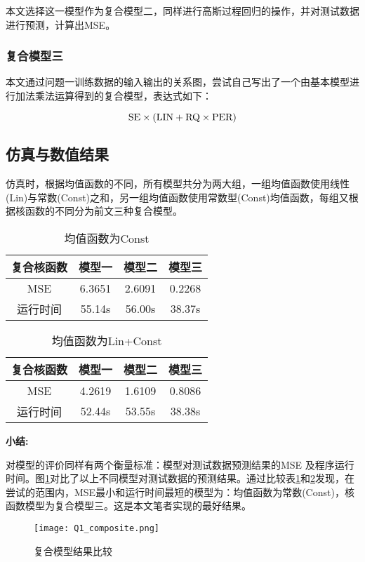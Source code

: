 \documentclass[10pt,twocolumn]{article}
\begin{document}
本文选择这一模型作为复合模型二，同样进行高斯过程回归的操作，并对测试数据进行预测，计算出MSE。

\subsubsection{复合模型三}
本文通过问题一训练数据的输入输出的关系图，尝试自己写出了一个由基本模型进行加法乘法运算得到的复合模型，表达式如下：

\[\rm {SE\times(LIN + RQ\times PER)}\]

\subsection{仿真与数值结果}
仿真时，根据均值函数的不同，所有模型共分为两大组，一组均值函数使用线性(Lin)与常数(Const)之和，另一组均值函数使用常数型(Const)均值函数，每组又根据核函数的不同分为前文三种复合模型。

\begin{table}[!htbp]
\centering
\begin{tabular}{c|c|c|c}
\hline\hline
复合核函数 & 模型一 & 模型二 & 模型三 \\ \hline
MSE & 6.3651 & 2.6091 & 0.2268 \\
运行时间 & 55.14s & 56.00s & 38.37s\\
\hline\hline
\end{tabular}
\caption{均值函数为Const}
\label{compmean1}
\end{table}

\begin{table}[!htbp]
\centering
\begin{tabular}{c|c|c|c}
\hline\hline
复合核函数 & 模型一 & 模型二 & 模型三 \\ \hline
MSE & 4.2619 & 1.6109 & 0.8086  \\
运行时间 & 52.44s & 53.55s & 38.38s \\
\hline\hline
\end{tabular}
\caption{均值函数为Lin+Const}
\label{compmean2}
\end{table}

{\kaishu \bf{小结:}}

对模型的评价同样有两个衡量标准：模型对测试数据预测结果的MSE
及程序运行时间。图\ref{q1composite}对比了以上不同模型对测试数据的预测结果。通过比较表\ref{compmean1}和\ref{compmean2}发现，在尝试的范围内，MSE最小和运行时间最短的模型为：均值函数为常数(Const)，核函数模型为复合模型三。这是本文笔者实现的最好结果。

\begin{figure}[!htbp]
    \centering
    \texttt{[image: Q1\_composite.png]}
    \caption{复合模型结果比较}
    \label{q1composite}
\end{figure}
\end{document}
